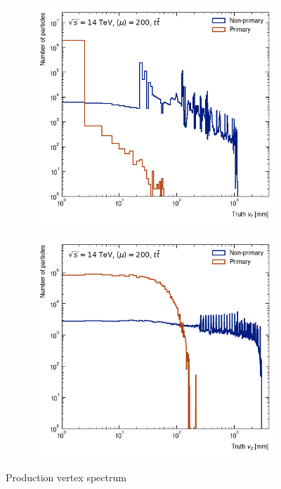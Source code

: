 \begin{figure}[h!]
\begin{subfigure}[b]{0.49\textwidth}
    \centering
    \includegraphics[width=\textwidth]{figures/vr-hist.png}
    \caption{}
    \label{subfig:radius-spectrum}
\end{subfigure}
\begin{subfigure}[b]{0.49\textwidth}
    \centering
    \includegraphics[width=\textwidth]{figures/vz-hist.png}
    \caption{}
    \label{subfig:z-spectrum}
\end{subfigure}
    \caption{Production vertex spectrum}
    \label{fig:vertex-spectrum}
\end{figure}

